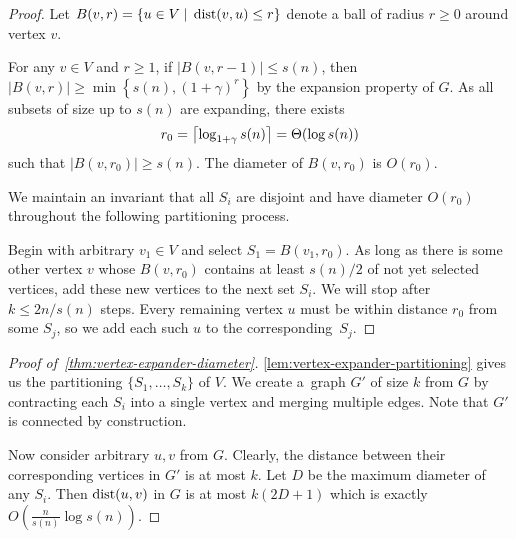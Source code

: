 \begin{proof}
    Let $B(v,r)=\{u\in V\;|\;\operatorname*{dist}(v,u)\leq r\}$ denote
    a ball of radius $r\geq 0$ around vertex $v$.
    
    For any $v\in V$ and $r\geq 1$, if $|B(v,r-1)|\leq s(n)$,
    then $|B(v,r)|\geq\min\left\{s(n),(1+\gamma)^r\right\}$
    by the expansion property of $G$.
    As all subsets of size up to $s(n)$ are expanding, there exists
    \begin{equation}
        r_0={\left\lceil{\log_{1+\gamma}s(n)}\right\rceil}=\Theta(\log s(n))
    \end{equation}
    such that $|B(v,r_0)|\geq s(n)$. The diameter of $B(v,r_0)$ is $O(r_0)$.
    
    We maintain an invariant that all $S_i$ are disjoint
    and have diameter $O(r_0)$ throughout the following partitioning process.
    
    Begin with arbitrary $v_1\in V$ and select $S_1=B(v_1,r_0)$.
    As long as there is some other vertex $v$ whose $B(v,r_0)$ contains
    at least $s(n)/2$ of not yet selected vertices,
    add these new vertices to the next set $S_i$.
    We will stop after $k\leq2n/s(n)$ steps.
    Every remaining vertex $u$ must be within distance $r_0$ from some $S_j$,
    so we add each such $u$ to the corresponding~$S_j$.
\end{proof}

\begin{proof}[Proof of~\autoref{thm:vertex-expander-diameter}]
    \autoref{lem:vertex-expander-partitioning} gives us
    the partitioning $\{S_1,\ldots,S_k\}$ of $V$.
    We create a~graph $G'$ of size $k$ from $G$ by contracting each $S_i$
    into a single vertex and merging multiple edges.
    Note that $G'$ is connected by construction.
    
    Now consider arbitrary $u,v$ from $G$. Clearly, the distance between
    their corresponding vertices in $G'$ is at most $k$.
    Let $D$ be the maximum diameter of any $S_i$.
    Then $\operatorname*{dist}(u,v)$ in $G$ is at most $k(2D+1)$
    which is exactly $O\left(\frac{n}{s(n)}\log s(n)\right)$.
\end{proof}
